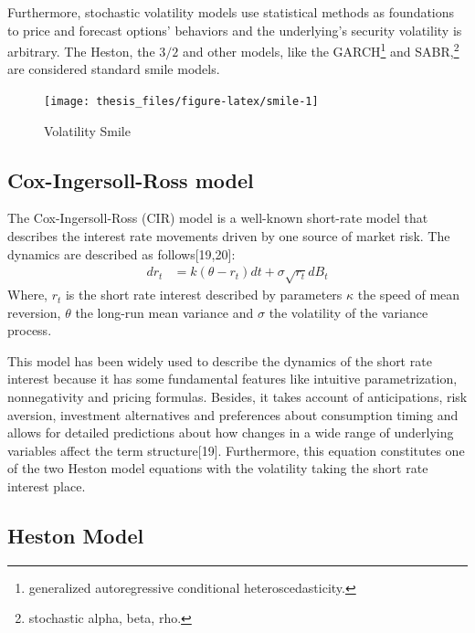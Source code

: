 \documentclass[12pt,twoside]{reedthesis}
\theoremstyle{definition}
\theoremstyle{definition}
\theoremstyle{remark}
\begin{document}
  
  Furthermore, stochastic volatility models use statistical methods as
  foundations to price and forecast options' behaviors and the
  underlying's security volatility is arbitrary. The Heston, the \(3/2\)
  and other models, like the GARCH\footnote{generalized autoregressive
    conditional heteroscedasticity.} and SABR,\footnote{stochastic alpha,
    beta, rho.} are considered standard smile models.
  \begin{figure}
  
  {\centering \texttt{[image: thesis\_files/figure-latex/smile-1]} 
  
  }
  
  \caption{Volatility Smile \label{smile}}\label{fig:smile}
  \end{figure}
  \subsection{Cox-Ingersoll-Ross model}\label{cir}
  
  The Cox-Ingersoll-Ross (CIR) model is a well-known short-rate model that
  describes the interest rate movements driven by one source of market
  risk. The dynamics are described as follows{[}19,20{]}:
  \begin{align}
  \label{eq:cir}
  dr_t &= k(\theta - r_t)dt + \sigma \sqrt{r_t} dB_t
  \end{align}
  \noindent
  Where, \(r_t\) is the short rate interest described by parameters
  \(\kappa\) the speed of mean reversion, \(\theta\) the long-run mean
  variance and \(\sigma\) the volatility of the variance process.
  
  This model has been widely used to describe the dynamics of the short
  rate interest because it has some fundamental features like intuitive
  parametrization, nonnegativity and pricing formulas. Besides, it takes
  account of anticipations, risk aversion, investment alternatives and
  preferences about consumption timing and allows for detailed predictions
  about how changes in a wide range of underlying variables affect the
  term structure{[}19{]}. Furthermore, this equation constitutes one of
  the two Heston model equations with the volatility taking the short rate
  interest place.
  
  \subsection{Heston Model}\label{hes1}
  
\end{document}
